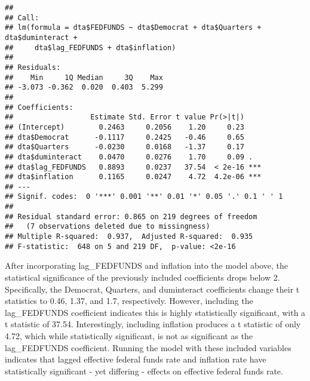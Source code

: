 \documentclass[]{article}
\begin{document}
\begin{verbatim}
## 
## Call:
## lm(formula = dta$FEDFUNDS ~ dta$Democrat + dta$Quarters + dta$duminteract + 
##     dta$lag_FEDFUNDS + dta$inflation)
## 
## Residuals:
##    Min     1Q Median     3Q    Max 
## -3.073 -0.362  0.020  0.403  5.299 
## 
## Coefficients:
##                  Estimate Std. Error t value Pr(>|t|)    
## (Intercept)        0.2463     0.2056    1.20     0.23    
## dta$Democrat      -0.1117     0.2425   -0.46     0.65    
## dta$Quarters      -0.0230     0.0168   -1.37     0.17    
## dta$duminteract    0.0470     0.0276    1.70     0.09 .  
## dta$lag_FEDFUNDS   0.8893     0.0237   37.54  < 2e-16 ***
## dta$inflation      0.1165     0.0247    4.72  4.2e-06 ***
## ---
## Signif. codes:  0 '***' 0.001 '**' 0.01 '*' 0.05 '.' 0.1 ' ' 1
## 
## Residual standard error: 0.865 on 219 degrees of freedom
##   (7 observations deleted due to missingness)
## Multiple R-squared:  0.937,  Adjusted R-squared:  0.935 
## F-statistic:  648 on 5 and 219 DF,  p-value: <2e-16
\end{verbatim}

After incorporating lag\_FEDFUNDS and inflation into the model above,
the statistical significance of the previously included coefficients
drops below 2. Specifically, the Democrat, Quarters, and duminteract
coefficients change their t statistics to 0.46, 1.37, and 1.7,
respectively. However, including the lag\_FEDFUNDS coefficient indicates
this is highly statistically significant, with a t statistic of 37.54.
Interestingly, including inflation produces a t statistic of only 4.72,
which while statistically significant, is not as significant as the
lag\_FEDFUNDS coefficient. Running the model with these included
variables indicates that lagged effective federal funds rate and
inflation rate have statistically significant - yet differing - effects
on effective federal funds rate.
\end{document}
